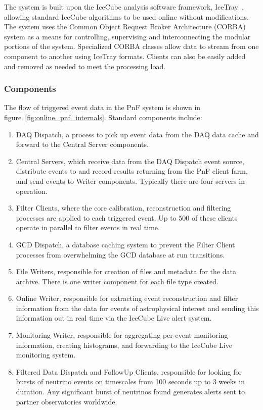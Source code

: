 The system is built upon the IceCube analysis software framework,
IceTray~\cite{DeYoung:2005zz}, allowing standard IceCube algorithms to be
used online without modifications.
The system uses the Common Object Request Broker Architecture
(CORBA) system as a means for controlling, supervising and interconnecting
the modular portions of the system.  Specialized CORBA classes allow
data to stream from one component to another using IceTray formats.
Clients can also be easily added and removed as needed to meet the
processing load.

\subsubsection{Components}

The flow of triggered event data in the PnF
system is shown in figure~\ref{fig:online_pnf_internals}.  Standard
components include: 
\begin{enumerate}
\item DAQ Dispatch, a process to pick up event data from the DAQ data cache
  and forward to the Central Server components. 
\item Central Servers, which
  receive data from the 
  DAQ Dispatch event source, distribute events to and record results
  returning from the PnF client farm, and send events to Writer components.
  Typically there are four servers in operation.
\item Filter Clients, where the core calibration, reconstruction and
  filtering processes are applied to each triggered event.  Up to 500 of
  these clients operate in parallel to filter 
  events in real time.
\item GCD Dispatch, a database caching system to prevent the
  Filter Client processes from overwhelming the GCD database at run transitions.
\item File Writers, responsible for creation of files and metadata for
  the data archive.  There is one writer component for each file type created.
\item Online Writer, responsible for extracting event reconstruction and
  filter information from the data for events of astrophysical interest and
  sending this information out in real time via the IceCube Live alert
  system.
\item Monitoring Writer, responsible for aggregating per-event monitoring
  information, creating histograms, and forwarding to the IceCube Live
  monitoring system.
\item Filtered Data Dispatch and FollowUp Clients, responsible for
  looking for bursts of neutrino events on timescales from 100 seconds up
  to 3 weeks in duration.  Any significant burst of neutrinos found generates alerts
  sent to partner observatories worldwide.
\end{enumerate}

